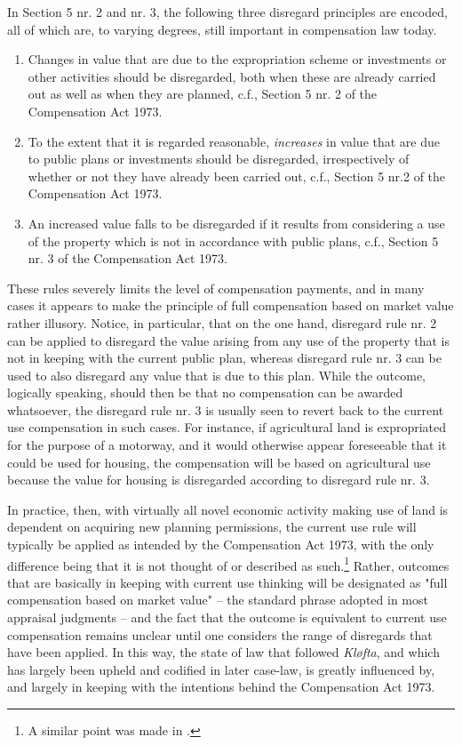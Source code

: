 \documentclass[10pt]{article} %
\begin{document}
In Section 5 nr. 2 and nr. 3, the following three disregard principles are encoded, all of which are, to varying degrees, still important in compensation law today.

\begin{enumerate}
\item Changes in value that are due to the expropriation scheme or investments or other activities should be disregarded, both when these are already carried out as well as when they are planned, c.f., Section 5 nr. 2 of the Compensation Act 1973.
\item To the extent that it is regarded reasonable, \emph{increases} in value that are due to public plans or investments should be disregarded, irrespectively of whether or not they have already been carried out, c.f., Section 5 nr.2 of the Compensation Act 1973.
\item An increased value falls to be disregarded if it results from considering a use of the property which is not in accordance with public plans, c.f., Section 5 nr. 3 of the Compensation Act 1973.
\end{enumerate}

These rules severely limits the level of compensation payments, and in many cases it appears to make the principle of full compensation based on market value rather illusory. Notice, in particular, that on the one hand, disregard rule nr. 2 can be applied to disregard the value arising from any use of the property that is not in keeping with the current public plan, whereas disregard rule nr. 3 can be used to also disregard any value that is due to this plan. While the outcome, logically speaking, should then be that no compensation can be awarded whatsoever, the disregard rule nr. 3 is usually seen to revert back to the current use compensation in such cases. For instance, if agricultural land is expropriated for the purpose of a motorway, and it would otherwise appear foreseeable that it could be used for housing, the compensation will be based on agricultural use because the value for housing is disregarded according to disregard rule nr. 3.

In practice, then, with virtually all novel economic activity making use of land is dependent on acquiring new planning permissions, the current use rule will typically be applied as intended by the Compensation Act 1973, with the only difference being that it is not thought of or described as such.\footnote{A similar point was made in \cite{stor}.} Rather, outcomes that are basically in keeping with current use thinking will be designated as "full compensation based on market value" -- the standard phrase adopted in most appraisal judgments -- and the fact that the outcome is equivalent to current use compensation remains unclear until one considers the range of disregards that have been applied. In this way, the state of law that followed \emph{Kløfta}, and which has largely been upheld and codified in later case-law, is greatly influenced by, and largely in keeping with the intentions behind the Compensation Act 1973. 
\end{document}
